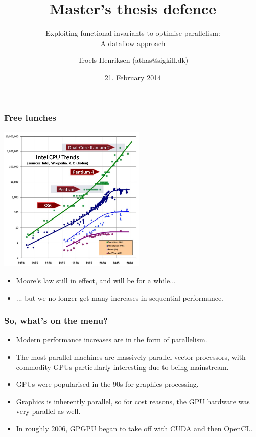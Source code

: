 \documentclass{beamer}
\title{Master's thesis defence}
\subtitle{Exploiting functional invariants to optimise parallelism:\\ A dataflow approach}
\author{Troels Henriksen (athas@sigkill.dk)}
\date{21. February 2014}
\institute{Computer Science\\
  University of Copenhagen}
\begin{document}
\frame{\titlepage}

\begin{frame}
  \frametitle{Free lunches}

  \centering
  \includegraphics[width=7cm]{img/CPU-Scaling.jpg}

  \begin{itemize}
  \item Moore's law still in effect, and will be for a while...
  \item ... but we no longer get many increases in sequential
    performance.
  \end{itemize}

\end{frame}

\begin{frame}
  \frametitle{So, what's on the menu?}

  \begin{itemize}
  \item Modern performance increases are in the form of parallelism.
  \item The most parallel machines are massively parallel vector
    processors, with commodity GPUs particularly interesting due to
    being mainstream.
  \item GPUs were popularised in the 90s for graphics processing.
  \item Graphics is inherently parallel, so for cost reasons, the GPU
    hardware was very parallel as well.
  \item In roughly 2006, GPGPU began to take off with CUDA and then
    OpenCL.
  \end{itemize}
\end{frame}
\end{document}
